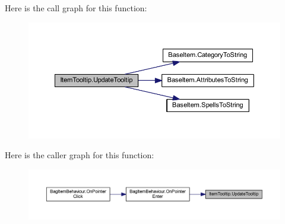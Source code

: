 Here is the call graph for this function\+:\nopagebreak
\begin{figure}[H]
\begin{center}
\leavevmode
\includegraphics[width=350pt]{class_item_tooltip_a51e15cd0c208c14105cc8bedf452385b_cgraph}
\end{center}
\end{figure}
Here is the caller graph for this function\+:\nopagebreak
\begin{figure}[H]
\begin{center}
\leavevmode
\includegraphics[width=350pt]{class_item_tooltip_a51e15cd0c208c14105cc8bedf452385b_icgraph}
\end{center}
\end{figure}
